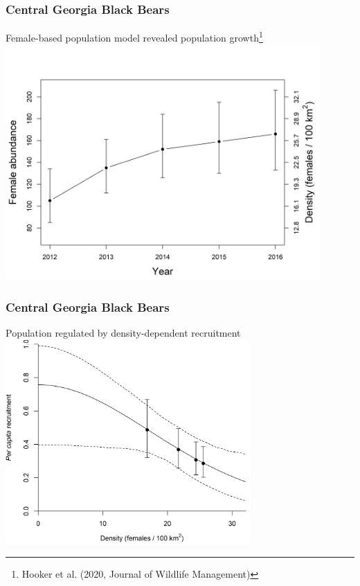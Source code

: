 \documentclass{beamer}\usepackage[]{graphicx}\usepackage[]{color}
\begin{document}
\begin{frame}
  \frametitle{Central Georgia Black Bears}
  Female-based population model revealed population
  growth\footnote{Hooker et al. (2020, Journal of Wildlife Management)} \\
  \vfill
  \centering
  \includegraphics[width=0.9\textwidth]{figs/fig-5_abundance} \\
\end{frame}


\begin{frame}
  \frametitle{Central Georgia Black Bears}
  Population regulated by density-dependent recruitment \\
  \vfill
  \centering
  \includegraphics[width=0.7\textwidth]{figs/fig-3_dd-recruitment} \\
\end{frame}
\end{document}
